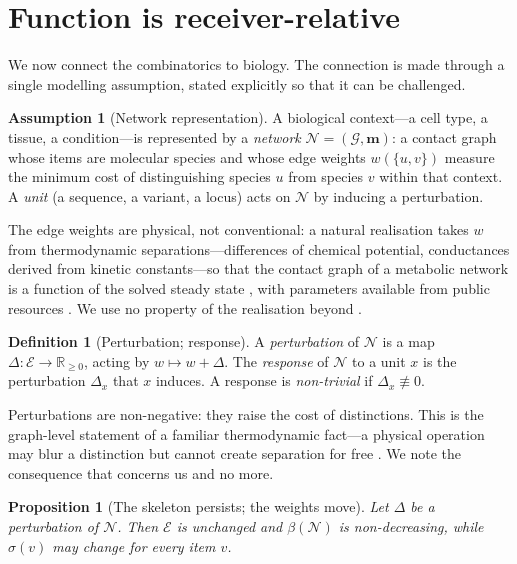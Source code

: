 \documentclass[11pt,twocolumn,a4paper]{article}
\newtheorem{proposition}[theorem]{Proposition}
\theoremstyle{definition}
\newtheorem{definition}[theorem]{Definition}
\newtheorem{assumption}[theorem]{Assumption}
\theoremstyle{remark}
\newcommand{\Gph}{\mathcal{G}}
\newcommand{\E}{\mathcal{E}}
\newcommand{\med}{\mathbf{m}}
\newcommand{\wt}{w}
\newcommand{\flo}{\beta}
\newcommand{\sep}{\sigma}
\newcommand{\Rset}{\mathbb{R}}
\newcommand{\netw}{\mathcal{N}}
\newcommand{\Perturb}{\Delta}
\begin{document}
\section{Function is receiver-relative}
\label{sec:function}

We now connect the combinatorics to biology. The connection is made
through a single modelling assumption, stated explicitly so that it can be
challenged.

\begin{assumption}[Network representation]
\label{ass:network}
A biological context---a cell type, a tissue, a condition---is represented
by a \emph{network} $\netw=(\Gph,\med)$: a contact graph whose items are
molecular species and whose edge weights $\wt(\{u,v\})$ measure the
minimum cost of distinguishing species $u$ from species $v$ within that
context. A \emph{unit} (a sequence, a variant, a locus) acts on $\netw$ by
inducing a perturbation.
\end{assumption}

The edge weights are physical, not conventional: a natural realisation
takes $\wt$ from thermodynamic separations---differences of chemical
potential, conductances derived from kinetic constants---so that the
contact graph of a metabolic network is a function of the solved steady
state \citep{beard2002,qian2005,orth2010}, with parameters available from
public resources \citep{kanehisa2000,jassal2020,schomburg2002}. We use no
property of the realisation beyond .

\begin{definition}[Perturbation; response]
\label{def:perturbation}
A \emph{perturbation} of $\netw$ is a map $\Perturb:\E\to\Rset_{\ge0}$,
acting by $\wt\mapsto\wt+\Perturb$. The \emph{response} of $\netw$ to a
unit $x$ is the perturbation $\Perturb_x$ that $x$ induces. A response is
\emph{non-trivial} if $\Perturb_x\not\equiv0$.
\end{definition}

Perturbations are non-negative: they raise the cost of distinctions. This
is the graph-level statement of a familiar thermodynamic fact---a physical
operation may blur a distinction but cannot create separation for free
\citep{landauer1961,bennett1982,parrondo2015}. We note the consequence
that concerns us and no more.

\begin{proposition}[The skeleton persists; the weights move]
\label{prop:skeleton}
Let $\Perturb$ be a perturbation of $\netw$. Then $\E$ is unchanged and
$\flo(\netw)$ is non-decreasing, while $\sep(v)$ may change for every item
$v$.
\end{proposition}
\end{document}
